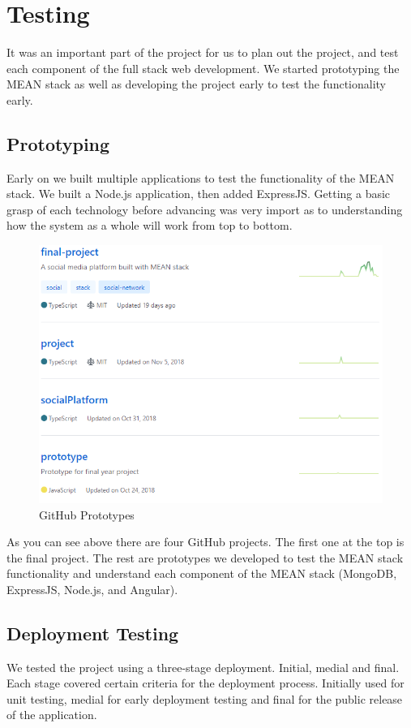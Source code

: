 \section{Testing}
It was an important part of the project for us to plan out the project, and test each component of the full stack web development. We started prototyping the MEAN stack as well as developing the project early to test the functionality early.

\subsection{Prototyping}
Early on we built multiple applications to test the functionality of the MEAN stack. We built a Node.js application, then added ExpressJS. Getting a basic grasp of each technology before advancing was very import as to understanding how the system as a whole will work from top to bottom.

\begin{figure}[H]
  \includegraphics[width=\linewidth]{img/prototypes.PNG}
  \caption{GitHub Prototypes}
  \label{fig:GHP}
\end{figure}

As you can see above there are four GitHub projects. The first one at the top is the final project. The rest are prototypes we developed to test the MEAN stack functionality and understand each component of the MEAN stack (MongoDB, ExpressJS, Node.js, and Angular).

\subsection{Deployment Testing}
We tested the project using a three-stage deployment. Initial, medial and final. Each stage covered certain criteria for the deployment process. Initially used for unit testing, medial for early deployment testing and final for the public release of the application.

